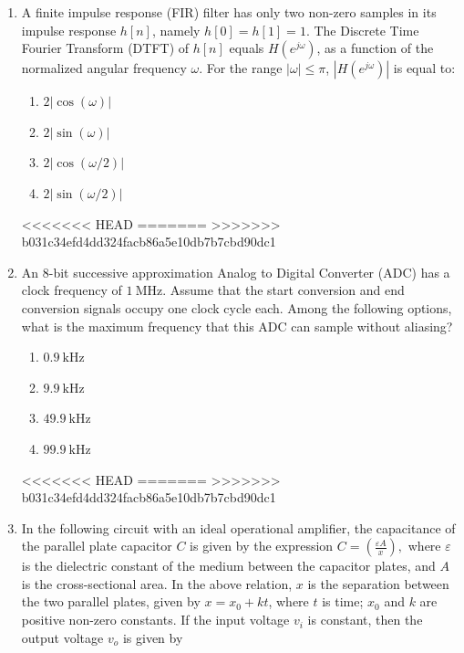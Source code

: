 \documentclass[journal]{IEEEtran}
\begin{document}
\begin{enumerate}
\item 
A finite impulse response (FIR) filter has only two non-zero samples in its impulse response \( h[n] \), namely \( h[0] = h[1] = 1 \). The Discrete Time Fourier Transform (DTFT) of \( h[n] \) equals \( H(e^{j\omega}) \), as a function of the normalized angular frequency \( \omega \). For the range \( |\omega| \leq \pi \), \( |H(e^{j\omega})| \) is equal to:

\begin{enumerate}
    \item \( 2|\cos(\omega)| \)
    \item \( 2|\sin(\omega)| \)
    \item \( 2|\cos(\omega/2)| \)
    \item \( 2|\sin(\omega/2)| \)
\end{enumerate}
<<<<<<< HEAD
\hfill{}
=======
\hfill{}
>>>>>>> b031c34efd4dd324facb86a5e10db7b7cbd90dc1

\item 
An 8-bit successive approximation Analog to Digital Converter (ADC) has a clock frequency of \( 1~\text{MHz} \). Assume that the start conversion and end conversion signals occupy one clock cycle each. Among the following options, what is the maximum frequency that this ADC can sample without aliasing?

\begin{enumerate}
    \item \( 0.9~\text{kHz} \)
    \item \( 9.9~\text{kHz} \)
    \item \( 49.9~\text{kHz} \)
    \item \( 99.9~\text{kHz} \)
\end{enumerate}
<<<<<<< HEAD
\hfill{}
=======
\hfill{}
>>>>>>> b031c34efd4dd324facb86a5e10db7b7cbd90dc1

\item 
In the following circuit with an ideal operational amplifier, the capacitance of the parallel plate capacitor \( C \) is given by the expression 
$
C = \left(\frac{\varepsilon A}{x}\right),
$
where \( \varepsilon \) is the dielectric constant of the medium between the capacitor plates, and \( A \) is the cross-sectional area. In the above relation, \( x \) is the separation between the two parallel plates, given by \( x = x_0 + kt \), where \( t \) is time; \( x_0 \) and \( k \) are positive non-zero constants. If the input voltage \( v_i \) is constant, then the output voltage \( v_o \) is given by


\end{enumerate}
\end{document}
